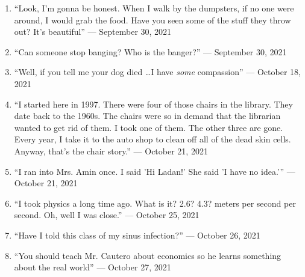 \documentclass[12pt]{article}
\begin{document}
\begin{enumerate}
  \item “Look, I'm gonna be honest. When I walk by the dumpsters, if no one were around, I would grab the food. Have you seen some of the stuff they throw out? It's beautiful” — September 30, 2021

  \item “Can someone stop banging? Who is the banger?” — September 30, 2021

  \item “Well, if you tell me your dog died \dots I have \textit{some} compassion” — October 18, 2021

  \item “I started here in 1997. There were four of those chairs in the library. They date back to the 1960s. The chairs were so in demand that the librarian wanted to get rid of them. I took one of them. The other three are gone. Every year, I take it to the auto shop to clean off all of the dead skin cells. Anyway, that's the chair story.” — October 21, 2021

  \item “I ran into Mrs. Amin once. I said 'Hi Ladan!' She said 'I have no idea.'” — October 21, 2021 

  \item “I took physics a long time ago. What is it? 2.6? 4.3? meters per second per second. Oh, well I was close.” — October 25, 2021

  \item “Have I told this class of my sinus infection?” — October 26, 2021

  \item “You should teach Mr. Cautero about economics so he learns something about the real world” — October 27, 2021

\end{enumerate}
\end{document}
